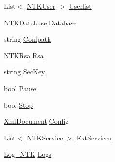 \begin{DoxyCompactItemize}
List$<$ \mbox{\hyperlink{class_n_t_k_1_1_n_t_k_user}{N\+T\+K\+User}} $>$ \mbox{\hyperlink{class_n_t_k_1_1_n_t_k_server_ae483c2086cbfb5995a3784af3a28917e}{Userlist}}
\item 
\mbox{\hyperlink{class_n_t_k_1_1_database_1_1_n_t_k_database}{N\+T\+K\+Database}} \mbox{\hyperlink{class_n_t_k_1_1_n_t_k_server_ae590145453fd070aa1ec1d13172b4222}{Database}}
\item 
string \mbox{\hyperlink{class_n_t_k_1_1_n_t_k_server_adf9893981505868234cf63cf656c0a22}{Confpath}}
\item 
\mbox{\hyperlink{class_n_t_k_1_1_security_1_1_n_t_k_rsa}{N\+T\+K\+Rsa}} \mbox{\hyperlink{class_n_t_k_1_1_n_t_k_server_a8980901f62a2080be6b10fe0e065b9cb}{Rsa}}
\item 
string \mbox{\hyperlink{class_n_t_k_1_1_n_t_k_server_aba18109128da621464d494d345cdd988}{Sec\+Key}}
\item 
bool \mbox{\hyperlink{class_n_t_k_1_1_n_t_k_server_a9f6983c1dc27aa8d614ea8ff806cf666}{Pause}}
\item 
bool \mbox{\hyperlink{class_n_t_k_1_1_n_t_k_server_aade70269bd47c8e71fdc31fe03edda61}{Stop}}
\item 
\mbox{\hyperlink{class_n_t_k_1_1_i_o_1_1_xml_1_1_xml_document}{Xml\+Document}} \mbox{\hyperlink{class_n_t_k_1_1_n_t_k_server_aeffb548abcde3baa2c4c8e8e86840359}{Config}}
\item 
List$<$ \mbox{\hyperlink{class_n_t_k_1_1_service_1_1_n_t_k_service}{N\+T\+K\+Service}} $>$ \mbox{\hyperlink{class_n_t_k_1_1_n_t_k_server_a3178c120d84bb1bcdc75b04fa5d0c94c}{Ext\+Services}}
\item 
\mbox{\hyperlink{class_n_t_k_1_1_other_1_1_log___n_t_k}{Log\+\_\+\+N\+TK}} \mbox{\hyperlink{class_n_t_k_1_1_n_t_k_server_a42f4c64e1d3c4a007696bb013ca1e95c}{Logs}}

\end{DoxyCompactItemize}
